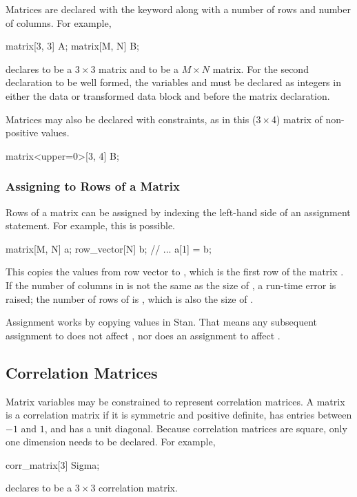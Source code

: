Matrices are declared with the keyword  along with a
number of rows and number of columns.  For example,
%
\begin{stancode}
matrix[3, 3] A;
matrix[M, N] B;
\end{stancode}
%
declares  to be a $3 \times 3$ matrix and  to be a $M
\times N$ matrix.  For the second declaration to be well formed, the
variables  and  must be declared as integers in either
the data or transformed data block and before the matrix declaration.

Matrices may also be declared with constraints, as in this ($3 \times $4)
matrix of non-positive values.
%
\begin{stancode}
matrix<upper=0>[3, 4] B;
\end{stancode}
%

\subsubsection{Assigning to Rows of a Matrix}

Rows of a matrix can be assigned by indexing the left-hand side of an
assignment statement. For example, this is possible.
%
\begin{stancode}
matrix[M, N] a;
row_vector[N] b;
// ...
a[1] = b;
\end{stancode}
%
This copies the values from row vector  to , which
is the first row of the matrix .  If the number of columns in
 is not the same as the size of , a run-time error is
raised;  the number of rows of  is , which is also the
size of .

Assignment works by copying values in Stan.  That means any subsequent
assignment to  does not affect , nor does an
assignment to  affect .


\subsection{Correlation Matrices}

Matrix variables may be constrained to represent correlation matrices.
A matrix is a correlation matrix if it is symmetric and positive
definite, has entries between $-1$ and $1$, and has a unit diagonal.
Because correlation matrices are square, only one dimension needs
to be declared.  For example,
%
\begin{stancode}
corr_matrix[3] Sigma;
\end{stancode}
%
declares  to be a $3 \times 3$ correlation matrix.

